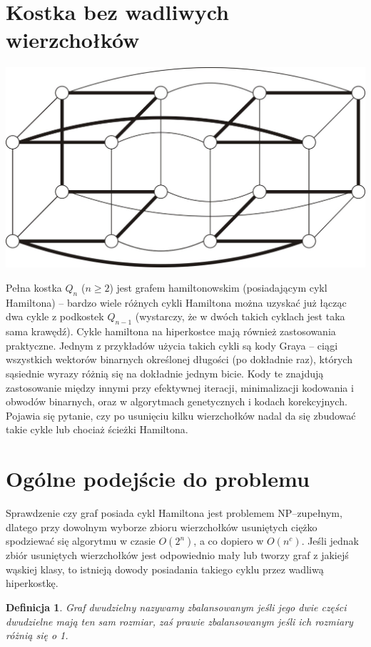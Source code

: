 \documentclass{pracamgr}
\newtheorem{defi}[theorem]{Definicja} %
\begin{document}
  \section{Kostka bez wadliwych wierzchołków}
   \begin{center}
    \includegraphics[scale=0.5]{img/Q4_hamilton.jpg}
   \end{center}
   Pełna kostka $Q_n$ ($n\ge2$) jest grafem hamiltonowskim (posiadającym cykl Hamiltona)
   -- bardzo wiele różnych cykli Hamiltona można uzyskać już łącząc dwa cykle
   z podkostek $Q_{n-1}$ (wystarczy, że w dwóch takich cyklach jest taka sama krawędź).
   Cykle hamiltona na hiperkostce mają również zastosowania praktyczne. Jednym z przykładów użycia takich cykli są kody Graya
   -- ciągi wszystkich wektorów binarnych określonej długości (po dokładnie raz), których sąsiednie wyrazy różnią się na dokładnie jednym bicie.
   Kody te znajdują zastosowanie między innymi przy efektywnej iteracji, minimalizacji kodowania i obwodów binarnych,
   oraz w algorytmach genetycznych i kodach korekcyjnych.\newline
   Pojawia się pytanie, czy po usunięciu kilku wierzchołków nadal da się zbudować takie cykle lub chociaż ścieżki Hamiltona.
  \section{Ogólne podejście do problemu}
   Sprawdzenie czy graf posiada cykl Hamiltona jest problemem NP--zupełnym, dlatego przy dowolnym wyborze zbioru wierzchołków usuniętych
   ciężko spodziewać się algorytmu w czasie $O(2^n)$, a co dopiero w $O(n^c)$. Jeśli jednak zbiór usuniętych wierzchołków
   jest odpowiednio mały lub tworzy graf z jakiejś wąskiej klasy, to istnieją dowody posiadania takiego cyklu przez wadliwą hiperkostkę.
   \begin{defi}\label{graf zbalansowany}
    Graf dwudzielny nazywamy \emph{zbalansowanym} jeśli jego dwie części dwudzielne mają ten sam rozmiar,
    zaś \emph{prawie zbalansowanym} jeśli ich rozmiary różnią się o 1.
   \end{defi}    
   
\end{document}
